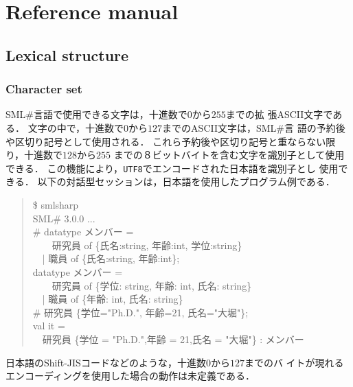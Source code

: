 \documentclass{jbook}
\newif\ifjp
\newcommand{\txt}[2]{#2}
\newcommand{\smlsharp}{SML\#}
\newcommand{\version}{3.0.0}
\newcommand{\code}[1]{\mbox{\large\tt #1}}
\newcommand{\myem}{\mbox{\ \ }}
\newenvironment{program}{\begin{quote}\begin{tt}}%
                        {\end{tt}\end{quote}}
\begin{document}
% 
% 
% 
	


\part{\txt{参照マニュアル}{Reference manual}}
\label{part:referenceManual}
        
\chapter{\txt{字句構造}{Lexical structure}}
\label{sec:lex}
\ifjp%
	\smlsharp{}言語の語彙の構造を定義する．
\else%
\fi%

\section{\txt{文字集合}{Character set}}
\ifjp%
	\smlsharp{}言語で使用できる文字は，十進数で$0$から$255$までの拡
張ASCII文字である．
	文字の中で，十進数で$0$から$127$までのASCII文字は，\smlsharp{}言
語の予約後や区切り記号として使用される．
	これら予約後や区切り記号と重ならない限り，十進数で$128$から$255$
までの８ビットバイトを含む文字を識別子として使用できる．
	この機能により，\code{UTF8}でエンコードされた日本語を識別子とし
使用できる．
	以下の対話型セッションは，日本語を使用したプログラム例である．
\begin{program}
  \$ smlsharp\\
  SML\# \version{} ...\\
  \# datatype メンバー = 
\\
   \myem\myem  研究員 of \{氏名:string, 年齢:int, 学位:string\} 
\\
   \myem | 職員 of \{氏名:string, 年齢:int\};
\\
  datatype メンバー =
\\
   \myem\myem 研究員 of \{学位: string, 年齢: int, 氏名: string\}
\\
  \myem | 職員 of \{年齢: int, 氏名: string\}
\\
  \# 研究員 \{学位="Ph.D.", 年齢=21, 氏名="大堀"\};
\\
  val it =
\\
  \myem 研究員 \{学位 = "Ph.D.",年齢 = 21,氏名 = "大堀"\} : メンバー
\end{program}
	日本語のShift-JISコードなどのような，十進数$0$から$127$までのバ
イトが現れるエンコーディングを使用した場合の動作は未定義である．
	
\end{document}
